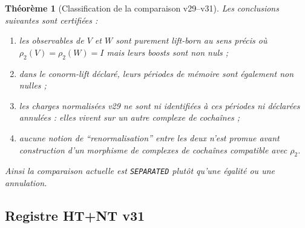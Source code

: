 \documentclass[11pt,a4paper]{article}
\newtheorem{theorem}{Théorème}[section]
\newcommand{\certSeparated}{\texttt{SEPARATED}}
\begin{document}
\begin{theorem}[Classification de la comparaison v29--v31]\label{thm:v31-v29-compare}
Les conclusions suivantes sont certifiées :
\begin{enumerate}[label=\textup{(\roman*)}]
\item les observables de $V$ et $W$ sont \emph{purement lift-born} au sens précis où
$\rho_2(V)=\rho_2(W)=I$ mais leurs boosts sont non nuls ;
\item dans le conorm-lift déclaré, leurs périodes de mémoire sont également non nulles ;
\item les charges normalisées v29 ne sont ni identifiées à ces périodes ni déclarées annulées :
elles vivent sur un autre complexe de cochaînes ;
\item aucune notion de ``renormalisation'' entre les deux n'est promue avant construction d'un
morphisme de complexes de cochaînes compatible avec $\rho_2$.
\end{enumerate}
Ainsi la comparaison actuelle est \certSeparated{} plutôt qu'une égalité ou une annulation.
\end{theorem}

\subsection{Registre HT+NT v31}
\end{document}

